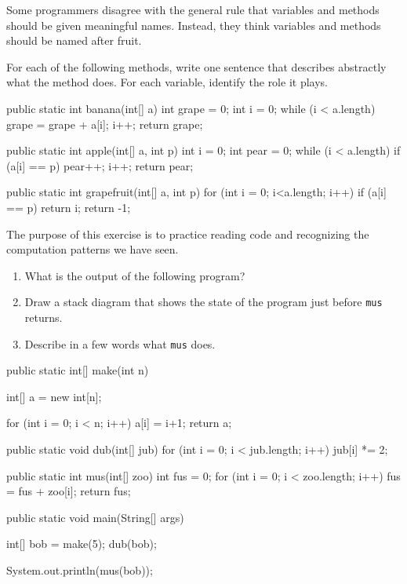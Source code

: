 \begin{exercise}
Some programmers disagree with the general rule that variables
and methods should be given meaningful names.  Instead, they
think variables and methods should be named after fruit.

For each of the following methods, write one sentence that
describes abstractly what the method does.  For each variable,
identify the role it plays.

\begin{code}
public static int banana(int[] a) {
    int grape = 0;
    int i = 0;
    while (i < a.length) {
        grape = grape + a[i];
        i++;
    }
    return grape;
}

public static int apple(int[] a, int p) {
    int i = 0;
    int pear = 0;
    while (i < a.length) {
        if (a[i] == p) pear++;
        i++;
    }
    return pear;
}

public static int grapefruit(int[] a, int p) {
    for (int i = 0; i<a.length; i++) {
        if (a[i] == p) return i;
    }
    return -1;
}
\end{code}

The purpose of this exercise is to practice reading code and
recognizing the computation patterns we have seen.
\end{exercise}


\begin{exercise}
\begin{enumerate}

\item What is the output of the following program?

\item Draw a stack diagram that shows the state of the
program just before {\tt mus} returns.

\item Describe in a few words what {\tt mus} does.
\end{enumerate}

\begin{code}
public static int[] make(int n) {
    int[] a = new int[n];

    for (int i = 0; i < n; i++) {
        a[i] = i+1;
    }
    return a;
}

public static void dub(int[] jub) {
    for (int i = 0; i < jub.length; i++) {
        jub[i] *= 2;
    }
}

public static int mus(int[] zoo) {
    int fus = 0;
    for (int i = 0; i < zoo.length; i++) {
        fus = fus + zoo[i];
    }
    return fus;
}

public static void main(String[] args) {
    int[] bob = make(5);
    dub(bob);

    System.out.println(mus(bob));
}
\end{code}
\end{exercise}


